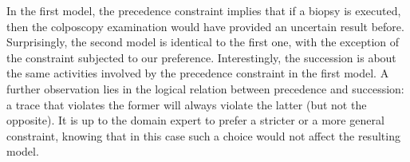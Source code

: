 In the first model, the \textsf{precedence} constraint implies that if a biopsy is executed, then the colposcopy examination would have provided an uncertain result before. Surprisingly, the second model is identical to the first one, with the exception of the constraint subjected to our preference. Interestingly, the \textsf{succession} is about the same activities involved by the \textsf{precedence} constraint in the first model. A further observation lies in the logical relation between \textsf{precedence} and \textsf{succession}: a trace that violates the former will always violate the latter (but not the opposite). It is up to the domain expert to prefer a stricter or a more general constraint, knowing that in this case such a choice would not affect the resulting model.



